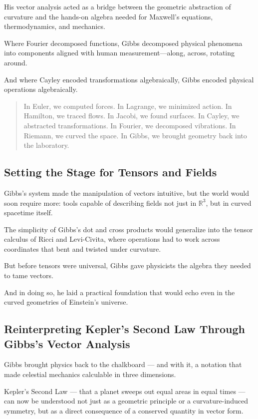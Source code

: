 His vector analysis acted as a bridge between the geometric abstraction of curvature  
and the hands-on algebra needed for Maxwell’s equations, thermodynamics, and mechanics.

Where Fourier decomposed functions, Gibbs decomposed physical phenomena into components aligned with human measurement—along, across, rotating around.

And where Cayley encoded transformations algebraically, Gibbs encoded physical operations algebraically.

\bigskip

\begin{quote}
In Euler, we computed forces.  
In Lagrange, we minimized action.  
In Hamilton, we traced flows.  
In Jacobi, we found surfaces.  
In Cayley, we abstracted transformations.  
In Fourier, we decomposed vibrations.  
In Riemann, we curved the space.  
In Gibbs, we brought geometry back into the laboratory.
\end{quote}

\subsection*{Setting the Stage for Tensors and Fields}

Gibbs’s system made the manipulation of vectors intuitive,  
but the world would soon require more:  
tools capable of describing fields not just in \( \mathbb{R}^3 \), but in curved spacetime itself.

The simplicity of Gibbs’s dot and cross products would generalize into the tensor calculus of Ricci and Levi-Civita,  
where operations had to work across coordinates that bent and twisted under curvature.

But before tensors were universal, Gibbs gave physicists the algebra they needed to tame vectors.

And in doing so, he laid a practical foundation that would echo even in the curved geometries of Einstein’s universe.


\subsection*{Reinterpreting Kepler’s Second Law Through Gibbs’s Vector Analysis}

Gibbs brought physics back to the chalkboard — and with it, a notation that made celestial mechanics calculable in three dimensions.

Kepler’s Second Law — that a planet sweeps out equal areas in equal times — can now be understood not just as a geometric principle or a curvature-induced symmetry,  
but as a direct consequence of a conserved quantity in vector form.

